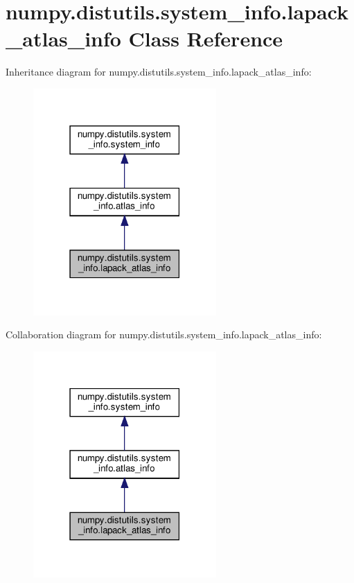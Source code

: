 \hypertarget{classnumpy_1_1distutils_1_1system__info_1_1lapack__atlas__info}{}\section{numpy.\+distutils.\+system\+\_\+info.\+lapack\+\_\+atlas\+\_\+info Class Reference}
\label{classnumpy_1_1distutils_1_1system__info_1_1lapack__atlas__info}


Inheritance diagram for numpy.\+distutils.\+system\+\_\+info.\+lapack\+\_\+atlas\+\_\+info\+:
\nopagebreak
\begin{figure}[H]
\begin{center}
\leavevmode
\includegraphics[width=198pt]{classnumpy_1_1distutils_1_1system__info_1_1lapack__atlas__info__inherit__graph}
\end{center}
\end{figure}


Collaboration diagram for numpy.\+distutils.\+system\+\_\+info.\+lapack\+\_\+atlas\+\_\+info\+:
\nopagebreak
\begin{figure}[H]
\begin{center}
\leavevmode
\includegraphics[width=198pt]{classnumpy_1_1distutils_1_1system__info_1_1lapack__atlas__info__coll__graph}
\end{center}
\end{figure}
